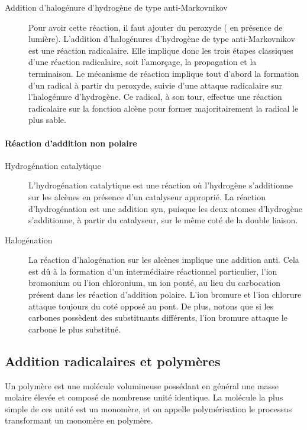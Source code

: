 \begin{description}
  \item[Addition d'halogénure d'hydrogène de type anti-Markovnikov]
    Pour avoir cette réaction, il faut ajouter du peroxyde ( en présence de lumière).
    L'addition d'halogénures d'hydrogène de type anti-Markovnikov est une réaction radicalaire.
    Elle implique donc les trois étapes classiques d'une réaction radicalaire, soit l'amorçage, la propagation et la terminaison.
    Le mécanisme de réaction implique tout d'abord la formation d'un radical à partir du peroxyde, suivie d'une attaque radicalaire sur l'halogénure d'hydrogène.
    Ce radical, à son tour, effectue une réaction radicalaire  sur la fonction alcène pour former majoritairement la radical le plus sable.
\end{description}

\paragraph{Réaction d'addition non polaire}

\begin{description}
  \item[Hydrogénation catalytique]

    L'hydrogénation catalytique est une réaction où l'hydrogène s'additionne sur les alcènes en présence d'un catalyseur approprié.
    La réaction d'hydrogénation est une addition syn, puisque les deux atomes d'hydrogène s'additionne, à partir du catalyseur, sur le même coté de la double liaison.

  \item[Halogénation]

    La réaction d'halogénation sur les alcènes implique une addition anti.
    Cela est dû à la formation d'un intermédiaire réactionnel particulier, l'ion bromonium ou l'ion chloronium, un ion ponté, au lieu du carbocation présent dans les réaction d'addition polaire.
    L'ion bromure et l'ion chlorure attaque toujours du coté opposé au  pont.
    De plus, notons que si les carbones possèdent des substituants différents, l'ion bromure attaque le carbone le plus substitué.
\end{description}


\subsection{Addition radicalaires et polymères}
Un polymère est une molécule volumineuse possédant en général une masse molaire élevée et composé de nombreuse unité identique.
La molécule la plus simple de ces unité est un monomère, et on appelle polymérisation le processus transformant un monomère en polymère.

